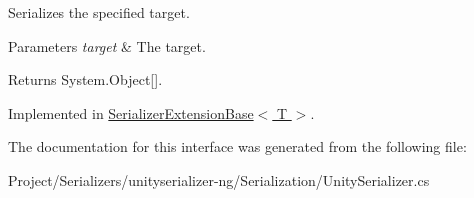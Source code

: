 Serializes the specified target. 


\begin{DoxyParams}{Parameters}
{\em target} & The target.\\
\hline
\end{DoxyParams}
\begin{DoxyReturn}{Returns}
System.\+Object\mbox{[}\mbox{]}.
\end{DoxyReturn}


Implemented in \hyperlink{class_serializer_extension_base_affe527ff9e902bb2eeaa37ec1a9d2f19}{Serializer\+Extension\+Base$<$ T $>$}.



The documentation for this interface was generated from the following file\+:\begin{DoxyCompactItemize}
\item 
Project/\+Serializers/unityserializer-\/ng/\+Serialization/Unity\+Serializer.\+cs\end{DoxyCompactItemize}
